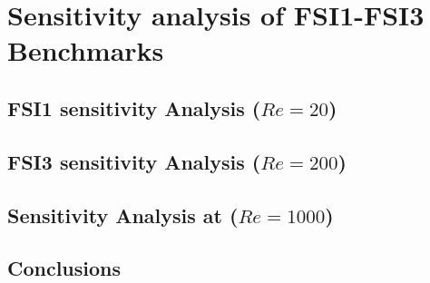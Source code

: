 \section{Sensitivity analysis of FSI1-FSI3 Benchmarks}


\subsection{FSI1 sensitivity Analysis ($Re=20$)}


\subsection{FSI3 sensitivity Analysis ($Re=200$)}


\subsection{Sensitivity Analysis at ($Re=1000$)}

\subsection{Conclusions}

